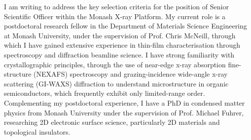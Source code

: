 \documentclass[10pt,a4paper,ragged2e,withhyper,paragraphstrue]{altacv}
\begin{document}
{    %
	I am writing to address the key selection criteria for the position of Senior Scientific Officer within the Monash X-ray Platform.
    My current role is a postdoctoral research fellow in the Department of Materials Science Engineering at Monash University, under the supervision of Prof. Chris McNeill, through which I have gained extensive experience in thin-film characterisation through spectroscopy and diffraction beamline science. I have strong familiarity with crystallographic principles, through the use of near-edge x-ray absorption fine-structure (NEXAFS) spectroscopy and grazing-incidence wide-angle x-ray scattering (GI-WAXS) diffraction to understand microstructure in organic semiconductors, which frequently exhibit only limited-range order. 
    Complementing my postdoctoral experience, I have a PhD in condensed matter physics from Monash University under the supervision of Prof. Michael Fuhrer, researching 2D electronic surface science, particularly 2D materials and topological insulators.

}
\end{document}
